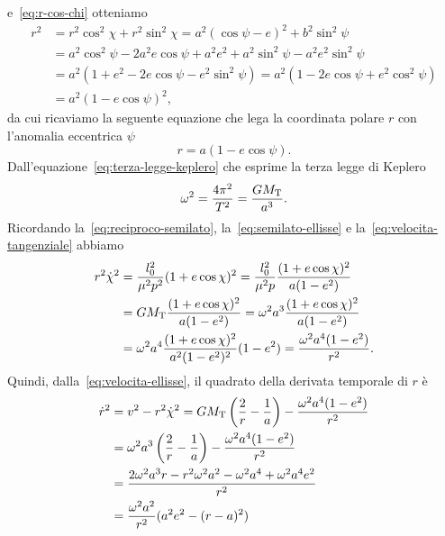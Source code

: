 e~\eqref{eq:r-cos-chi} otteniamo
\begin{equation}
  \begin{split}
    r^2 &= r^2\cos^2\chi + r^2\sin^2\chi = a^2(\cos\psi - e)^2 + b^2\sin^2\psi\\
    &= a^2\cos^2\psi-2a^2e\cos\psi+a^2e^2+a^2\sin^2\psi-a^2e^2\sin^2\psi\\
    &= a^2(1+e^2-2e\cos\psi-e^2\sin^2\psi) = a^2(1-2e\cos\psi+e^2\cos^2\psi)\\
    &= a^2(1 - e\cos\psi)^2,
  \end{split}
\end{equation}
da cui ricaviamo la seguente equazione che lega la coordinata polare $r$ con
l'anomalia eccentrica $\psi$
\begin{equation}
  \label{eq:r-anomalia-eccentrica}
  r = a(1 - e\cos\psi).
\end{equation}
Dall'equazione~\eqref{eq:terza-legge-keplero} che esprime la terza legge di
Keplero
\begin{equation}
  \omega^2 = \frac{4\pi^2}{T^2} = \frac{GM_\textup{T}}{a^3}.
\end{equation}
Ricordando la~\eqref{eq:reciproco-semilato}, la~\eqref{eq:semilato-ellisse} e
la~\eqref{eq:velocita-tangenziale} abbiamo
\begin{equation}
  \begin{split}
    r^2\dot{\chi}^2 &= \frac{l_0^2}{\mu^2p^2}(1 + e\cos\chi)^2 =
    \frac{l_0^2}{\mu^2p} \frac{(1+e\cos\chi)^2}{a(1-e^2)} \\
    &= GM_\textup{T} \frac{(1+e\cos\chi)^2}{a(1-e^2)} = \omega^2a^3
    \frac{(1+e\cos\chi)^2}{a(1-e^2)} \\
    &= \omega^2a^4 \frac{(1+e\cos\chi)^2}{a^2(1-e^2)^2}(1-e^2) =
    \frac{\omega^2a^4(1-e^2)}{r^2}.
  \end{split}
\end{equation}
Quindi, dalla~\eqref{eq:velocita-ellisse}, il quadrato della derivata temporale
di $r$ è
\begin{equation}
  \begin{split}
    \dot{r}^2 &= v^2 - r^2\dot{\chi}^2 = GM_\textup{T}
    \left(
      \frac{2}{r} - \frac{1}{a}
    \right) - \frac{\omega^2a^4(1-e^2)}{r^2} \\
        &= \omega^2a^3
    \left(
      \frac{2}{r} - \frac{1}{a}
    \right) - \frac{\omega^2a^4(1-e^2)}{r^2} \\
    &= \frac{2\omega^2a^3r-r^2\omega^2a^2-\omega^2a^4+\omega^2a^4e^2}{r^2}\\
    &= \frac{\omega^2a^2}{r^2}(a^2e^2-(r-a)^2)
  \end{split}
\end{equation}
